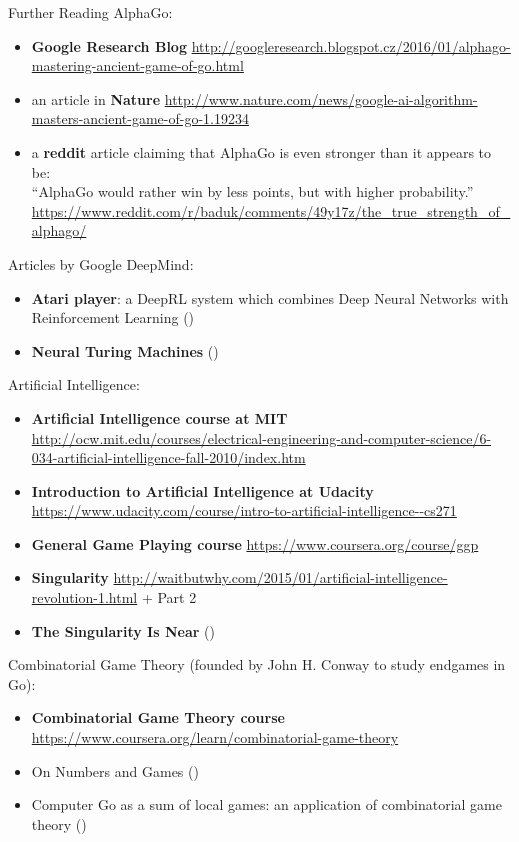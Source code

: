 \documentclass{beamer}
\begin{document}
  \begin{frame}[allowframebreaks]{Further Reading}
    \tiny
    AlphaGo:
    \begin{itemize}
      \item \textbf{Google Research Blog} \url{http://googleresearch.blogspot.cz/2016/01/alphago-mastering-ancient-game-of-go.html}
      \item an article in \textbf{Nature} \url{http://www.nature.com/news/google-ai-algorithm-masters-ancient-game-of-go-1.19234}
      \item a \textbf{reddit} article claiming that AlphaGo is even stronger than it appears to be: \\
        ``AlphaGo would rather win by less points, but with higher probability.'' \\
        \url{https://www.reddit.com/r/baduk/comments/49y17z/the_true_strength_of_alphago/}
    \end{itemize}

    Articles by Google DeepMind:
    \begin{itemize}
      \item \textbf{Atari player}: a DeepRL system which combines Deep Neural Networks with Reinforcement Learning (\cite{Mnih2015human})
      \item \textbf{Neural Turing Machines} (\cite{Graves2014neural})
    \end{itemize}

    Artificial Intelligence:
    \begin{itemize}
      \item \textbf{Artificial Intelligence course at MIT} \url{http://ocw.mit.edu/courses/electrical-engineering-and-computer-science/6-034-artificial-intelligence-fall-2010/index.htm}
      \item \textbf{Introduction to Artificial Intelligence at Udacity} \url{https://www.udacity.com/course/intro-to-artificial-intelligence--cs271}
      \item \textbf{General Game Playing course} \url{https://www.coursera.org/course/ggp}
      \item \textbf{Singularity} \url{http://waitbutwhy.com/2015/01/artificial-intelligence-revolution-1.html} + Part 2
      \item \textbf{The Singularity Is Near} (\cite{Kurzweil2005singularity})
    \end{itemize}

    Combinatorial Game Theory (founded by John H. Conway to study endgames in Go):
    \begin{itemize}
      \item \textbf{Combinatorial Game Theory course} \url{https://www.coursera.org/learn/combinatorial-game-theory}
      \item On Numbers and Games (\cite{Conway1976number})
      \item Computer Go as a sum of local games: an application of combinatorial game theory (\cite{Muller1995computer})
    \end{itemize}


\end{frame}
\end{document}
